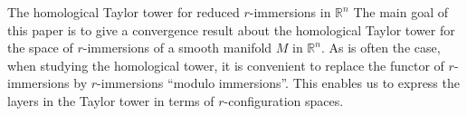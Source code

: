 \documentclass[12pt]{amsart}
\newcommand{\R}{{\mathbb R}}
\theoremstyle{plain}
\theoremstyle{definition}
\theoremstyle{remark}
\begin{document}
\vspace*{0.25cm}
\begin{section}{The homological Taylor tower for reduced $r$-immersions in $\mathbb R^n$}\label{S:main}
The main goal of this paper is to give a convergence result about the homological Taylor tower for the space of $r$-immersions of a smooth manifold $M$ in $\R^n$. As is often the case, when studying the homological tower, it is convenient to replace the functor of $r$-immersions by $r$-immersions ``modulo immersions''. This enables us to express the layers in the Taylor tower in terms of $r$-configuration spaces.





\end{section}
\end{document}
